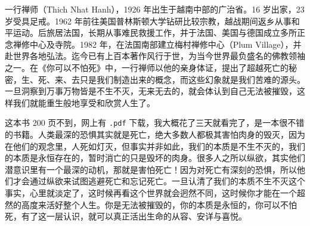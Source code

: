 \begin{book}
    一行禅师（Thich Nhat Hanh），1926 年出生于越南中部的广治省。16 岁出家，23 岁受具足戒。1962 年前往美国普林斯顿大学钻研比较宗教，越战期间返乡从事和平运动。后旅居法国，长期从事难民救援工作，并于法国、美国与德国成立多所正念禅修中心及寺院。1982 年，在法国南部建立梅村禅修中心（Plum Village），并赴世界各地弘法。迄今已有上百本著作风行于世，为当今世界最负盛名的佛教领袖之一。在《你可以不怕死》中，一行禅师以他的亲身体证，提出了超越死亡的秘密，生、死、来、去只是我们制造出来的概念，而这些幻象就是我们苦难的源头。一旦洞察到万事万物皆是不生不灭，无来无去的，就会体认到自己无法被摧毁，这样我们就能重生般地享受和欣赏人生了。

    这本书 200 页不到，网上有 \texttt{.pdf} 下载，我大概花了三天就看完了，是一本很不错的书籍。人类最深的恐惧其实就是死亡，绝大多数人都极其害怕肉身的毁灭，因为在他们的观念里，人死如灯灭，但事实并非如此，我们的本质是不生不灭的，我们的本质是永恒存在的，暂时消亡的只是毁坏的肉身。很多人之所以纵欲，其实他们潜意识里有一个最深的动机，那就是害怕死亡！因为对死亡有深刻的恐惧，所以他们才会通过纵欲来试图逃避死亡和忘记死亡。一旦认清了我们的本质不生不灭这个事实，心里就淡定了，这时候再看这个世界就会迥然不同，这时候你才能在一个超然的高度来活好整个人生。你是无法被摧毁的，你的本质是永恒的，你可以不怕死，有了这一层认识，就可以真正活出生命的从容、安详与喜悦。
\end{book}
